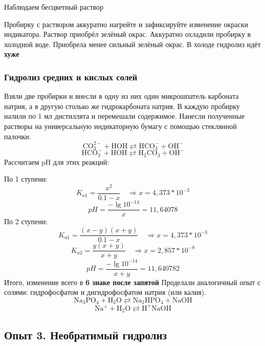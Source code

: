 \documentclass[a4paper,12pt]{article}
\begin{document}
Наблюдаем бесцветный раствор

Пробирку с раствором аккуратно нагрейте и зафиксируйте изменение
окраски индикатора. Раствор приобрёл зелёный окрас. Аккуратно охладили пробирку в холодной воде. Приобрела менее сильный зелёный окрас. В холоде гидролиз идёт \textbf{хуже}


\subsubsection{Гидролиз средних и кислых солей}
Взяли две пробирки и внесли в одну из них один микрошпатель карбоната
натрия, а в другую столько же гидрокарбоната натрия. В каждую пробирку налили по
1 мл дистиллята и перемешали содержимое. Нанесли полученные растворы на
универсальную индикаторную бумагу с помощью стеклянной палочки.
\begin{equation}
\mathrm{CO_3^{2-} + HOH \rightleftarrows HCO_3^- + OH^-}
\end{equation}
\begin{equation}
\mathrm{HCO_3^- + HOH \rightleftarrows H_2CO_3 + OH^-}
\end{equation}
Рассчитаем pH для этих реакций:

По 1 ступени:
\begin{equation}
K_{a1} = \dfrac{x^2}{0.1-x} \quad \Rightarrow x=4,373*10^{-3}
\end{equation}
\begin{equation}
pH=\dfrac{-\lg10^{-14}}{x}=11,64078
\end{equation}
По 2 ступени:
\begin{equation}
K_{a1} = \dfrac{(x-y)(x+y)}{0.1-x} \quad \Rightarrow x=4,373*10^{-3}
\end{equation}
\begin{equation}
K_{a2} = \dfrac{y(x+y)}{x+y} \quad \Rightarrow x=2,857*10^{-8}
\end{equation}
\begin{equation}
pH=\dfrac{-\lg10^{-14}}{x+y}=11,640782
\end{equation}
Итого, изменение всего в \textbf{6 знаке после запятой}
Проделали аналогичный опыт с солями: гидрофосфатом и дигидрофосфатом
натрия (или калия).
\begin{equation}
\mathrm{Na_3PO_4 + H_2O \rightleftarrows Na_2HPO_4 + NaOH}
\end{equation}
\begin{equation}
\mathrm{Na^+ + H_2O \rightleftarrows H^+ NaOH}
\end{equation}
\subsection{Опыт 3. Необратимый гидролиз}
\end{document}
